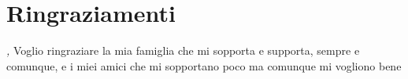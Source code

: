 
\cleardoublepage
{}
{}



\bigskip

\begingroup
\let\clearpage\relax
\let\cleardoublepage\relax
\let\cleardoublepage\relax

\chapter*{Ringraziamenti}

\noindent\textit{\myLocation, \myTime}
Voglio ringraziare la mia famiglia che mi sopporta e supporta, sempre e comunque, e i miei amici che mi sopportano poco ma comunque mi vogliono bene

\hfill \myName

\endgroup


